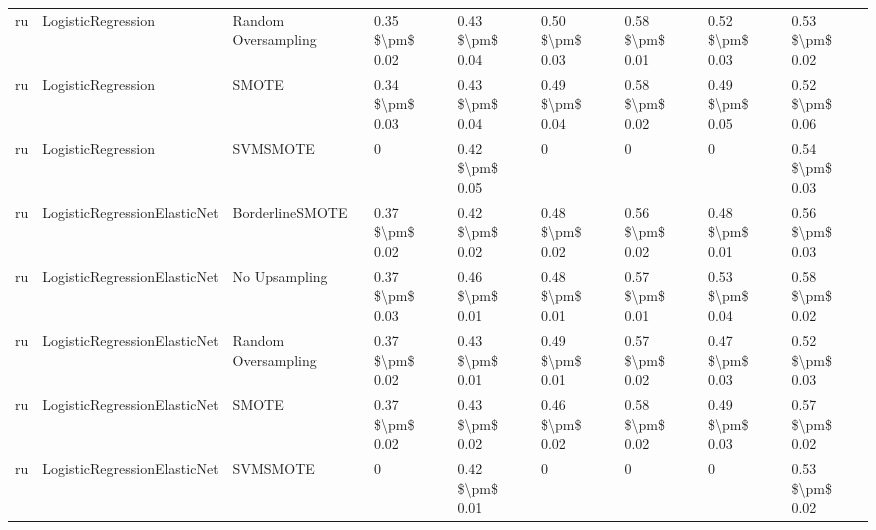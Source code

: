 \begin{tabular}{lllllllll}
      ru &              LogisticRegression &           Random Oversampling & 0.35 \$\textbackslash pm\$ 0.02 &           0.43 \$\textbackslash pm\$ 0.04 &       0.50 \$\textbackslash pm\$ 0.03 &        0.58 \$\textbackslash pm\$ 0.01 &                         0.52 \$\textbackslash pm\$ 0.03 &     0.53 \$\textbackslash pm\$ 0.02 \\
      ru &              LogisticRegression &                         SMOTE & 0.34 \$\textbackslash pm\$ 0.03 &           0.43 \$\textbackslash pm\$ 0.04 &       0.49 \$\textbackslash pm\$ 0.04 &        0.58 \$\textbackslash pm\$ 0.02 &                         0.49 \$\textbackslash pm\$ 0.05 &     0.52 \$\textbackslash pm\$ 0.06 \\
      ru &              LogisticRegression &                      SVMSMOTE &               0 &           0.42 \$\textbackslash pm\$ 0.05 &                     0 &                      0 &                                       0 &     0.54 \$\textbackslash pm\$ 0.03 \\
      ru &    LogisticRegressionElasticNet &               BorderlineSMOTE & 0.37 \$\textbackslash pm\$ 0.02 &           0.42 \$\textbackslash pm\$ 0.02 &       0.48 \$\textbackslash pm\$ 0.02 &        0.56 \$\textbackslash pm\$ 0.02 &                         0.48 \$\textbackslash pm\$ 0.01 &     0.56 \$\textbackslash pm\$ 0.03 \\
      ru &    LogisticRegressionElasticNet &                 No Upsampling & 0.37 \$\textbackslash pm\$ 0.03 &           0.46 \$\textbackslash pm\$ 0.01 &       0.48 \$\textbackslash pm\$ 0.01 &        0.57 \$\textbackslash pm\$ 0.01 &                         0.53 \$\textbackslash pm\$ 0.04 &     0.58 \$\textbackslash pm\$ 0.02 \\
      ru &    LogisticRegressionElasticNet &           Random Oversampling & 0.37 \$\textbackslash pm\$ 0.02 &           0.43 \$\textbackslash pm\$ 0.01 &       0.49 \$\textbackslash pm\$ 0.01 &        0.57 \$\textbackslash pm\$ 0.02 &                         0.47 \$\textbackslash pm\$ 0.03 &     0.52 \$\textbackslash pm\$ 0.03 \\
      ru &    LogisticRegressionElasticNet &                         SMOTE & 0.37 \$\textbackslash pm\$ 0.02 &           0.43 \$\textbackslash pm\$ 0.02 &       0.46 \$\textbackslash pm\$ 0.02 &        0.58 \$\textbackslash pm\$ 0.02 &                         0.49 \$\textbackslash pm\$ 0.03 &     0.57 \$\textbackslash pm\$ 0.02 \\
      ru &    LogisticRegressionElasticNet &                      SVMSMOTE &               0 &           0.42 \$\textbackslash pm\$ 0.01 &                     0 &                      0 &                                       0 &     0.53 \$\textbackslash pm\$ 0.02 \\

\end{tabular}

